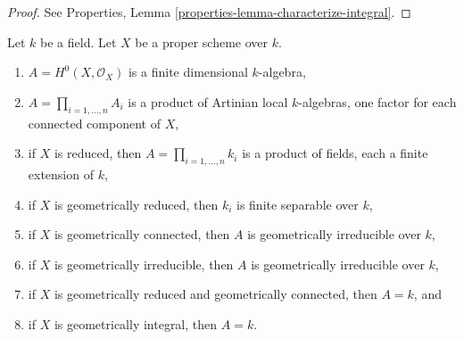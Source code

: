 \begin{proof}
See Properties, Lemma \ref{properties-lemma-characterize-integral}.
\end{proof}

\begin{lemma}
\label{lemma-proper-geometrically-reduced-global-sections}
Let $k$ be a field. Let $X$ be a proper scheme over $k$.
\begin{enumerate}
\item $A = H^0(X, \mathcal{O}_X)$ is a finite dimensional $k$-algebra,
\item $A = \prod_{i = 1, \ldots, n} A_i$ is a product of Artinian
local $k$-algebras, one factor for each connected component of $X$,
\item if $X$ is reduced, then $A = \prod_{i = 1, \ldots, n} k_i$
is a product of fields, each a finite extension of $k$,
\item if $X$ is geometrically reduced, then $k_i$ is finite separable
over $k$,
\item if $X$ is geometrically connected, then $A$ is geometrically
irreducible over $k$,
\item if $X$ is geometrically irreducible, then $A$ is geometrically
irreducible over $k$,
\item if $X$ is geometrically reduced and geometrically connected, then
$A = k$, and
\item if $X$ is geometrically integral, then $A = k$.
\end{enumerate}
\end{lemma}

